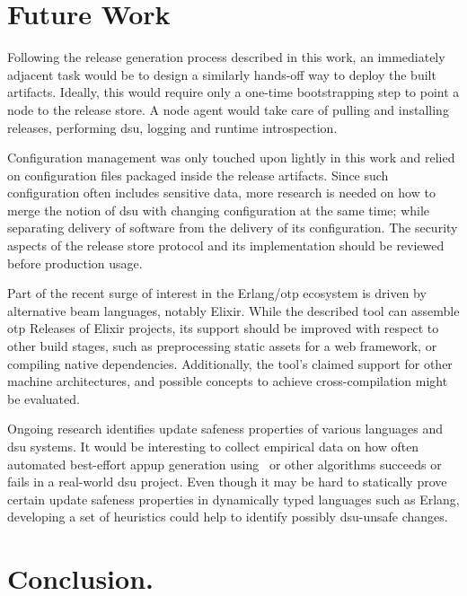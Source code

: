 \cleardoublepage
\section{Future Work}

Following the release generation process described in this work, an immediately adjacent task would be to design a similarly hands-off way to deploy the built artifacts. Ideally, this would require only a one-time bootstrapping step to point a node to the release store. A node agent would take care of pulling and installing releases, performing \acrshort{dsu}, logging and runtime introspection.

Configuration management was only touched upon lightly in this work and relied on configuration files packaged inside the release artifacts. Since such configuration often includes sensitive data, more research is needed on how to merge the notion of \acrshort{dsu} with changing configuration at the same time; while separating delivery of software from the delivery of its configuration. The security aspects of the release store protocol and its implementation should be reviewed before production usage.

Part of the recent surge of interest in the Erlang/\acrshort{otp} ecosystem is driven by alternative \acrshort{beam} languages, notably Elixir. While the described tool can assemble \acrshort{otp} Releases of Elixir projects, its support should be improved with respect to other build stages, such as preprocessing static assets for a web framework, or compiling native dependencies. Additionally, the tool's claimed support for other machine architectures, and possible concepts to achieve cross-compilation might be evaluated.

Ongoing research identifies update safeness properties of various languages and \acrshort{dsu} systems. It would be interesting to collect empirical data on how often automated best-effort \acrshort{appup} generation using~\cite{rebar3appup} or other algorithms succeeds or fails in a real-world \acrshort{dsu} project. Even though it may be hard to statically prove certain update safeness properties in dynamically typed languages such as Erlang, developing a set of heuristics could help to identify possibly \acrshort{dsu}-unsafe changes.

\cleardoublepage
\section{Conclusion.}

